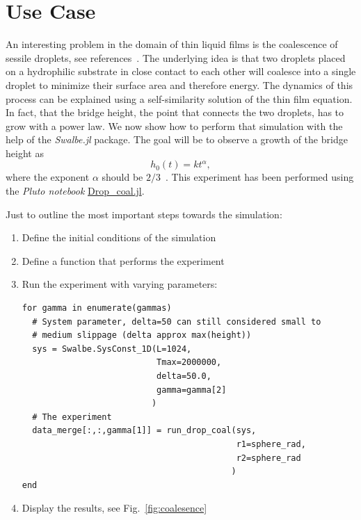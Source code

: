 \section{Use Case}
\label{sec:Joss_use}
An interesting problem in the domain of thin liquid films is the coalescence of sessile droplets, see references~\cite{eggersCoalescenceLiquidDrops1999, eddiInfluenceDropletGeometry2013, hernandez-sanchezSymmetricAsymmetricCoalescence2012, aartsHydrodynamicsDropletCoalescence2005}.
The underlying idea is that two droplets placed on a hydrophilic substrate in close contact to each other will coalesce into a single droplet to minimize their surface area and therefore energy.
The dynamics of this process can be explained using a self-similarity solution of the thin film equation.
In fact, that the bridge height, the point that connects the two droplets, has to grow with a power law.
We now show how to perform that simulation with the help of the \textit{Swalbe.jl} package.
The goal will be to observe a growth of the bridge height as 
\begin{equation}\label{eq:powerlaw}
    h_0(t) = k t^{\alpha},
\end{equation}
where the exponent $\alpha$ should be $2/3$~\cite{pawarSymmetricAsymmetricCoalescence2019, suiInertialCoalescenceDroplets2013}.
This experiment has been performed using the \textit{Pluto notebook} \href{https://jugit.fz-juelich.de/compflu/swalbe.jl/-/blob/JOSS/scripts/Drop_coal.jl}{Drop\_coal.jl}.

Just to outline the most important steps towards the simulation:
\begin{enumerate}
\item Define the initial conditions of the simulation
\item Define a function that performs the experiment
\item Run the experiment with varying parameters:
\begin{verbatim}
for gamma in enumerate(gammas)
  # System parameter, delta=50 can still considered small to  
  # medium slippage (delta approx max(height))
  sys = Swalbe.SysConst_1D(L=1024, 
                           Tmax=2000000, 
                           delta=50.0, 
                           gamma=gamma[2]
                          )
  # The experiment
  data_merge[:,:,gamma[1]] = run_drop_coal(sys, 
                                           r1=sphere_rad, 
                                           r2=sphere_rad
                                          )
end
\end{verbatim}
\item Display the results, see Fig.~\ref{fig:coalesence} 
\end{enumerate}

